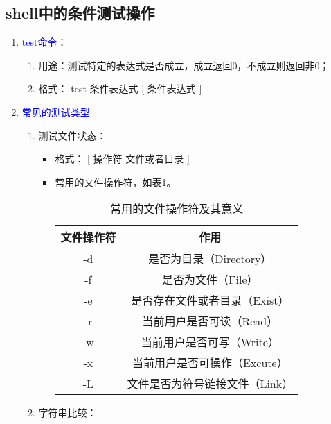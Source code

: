 \subsection{shell中的条件测试操作}
\begin{enumerate}
  \item \textcolor{blue}{test命令}：
    \begin{enumerate}
      \item 用途：测试特定的表达式是否成立，成立返回0，不成立则返回非0；
      \item 格式： test 条件表达式 [ 条件表达式 ]
    \end{enumerate}
  \item \textcolor{blue}{常见的测试类型}
    \begin{enumerate}
      \item 测试文件状态：
        \begin{itemize}
            \item 格式： [ 操作符 文件或者目录 ]
            \item 常用的文件操作符，如表\ref{tab:test_sign}。
              \begin{table}[h]
               \centering
               \caption{常用的文件操作符及其意义}
                 \begin{tabular*}{1\textwidth}{@{\extracolsep{\fill}}cc}
                 \toprule
                 文件操作符     &作用                            \\
                 \midrule
                 -d            &是否为目录（Directory）          \\
                 -f            &是否为文件（File）               \\
                 -e            &是否存在文件或者目录（Exist）     \\
                 -r            &当前用户是否可读（Read）          \\
                 -w            &当前用户是否可写（Write）         \\
                 -x            &当前用户是否可操作（Excute）      \\
                 -L            &文件是否为符号链接文件（Link）     \\
                 \bottomrule
                 \end{tabular*}%
               \label{tab:test_sign}%
              \end{table}%
            \end{itemize}
      \item 字符串比较：

\end{enumerate}
\end{enumerate}
